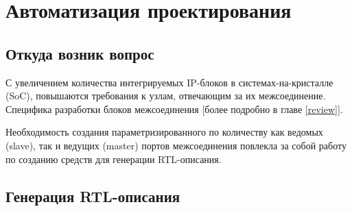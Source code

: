 
\chapter{Автоматизация проектирования}

\section{Откуда возник вопрос}

С увеличением количества интегрируемых IP-блоков в системах-на-кристалле (SoC), повышаются требования к узлам, отвечающим за их межсоединение.
Специфика разработки блоков межсоединения [{\color{red}более подробно в главе \ref{review}}].

Необходимость создания параметризированного по количеству как ведомых (slave), так и ведущих (master) портов межсоединения повлекла за собой работу по созданию средств для генерации RTL-описания.

\section{Генерация RTL-описания}

\clearpage

